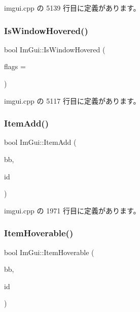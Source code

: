  imgui.\+cpp の 5139 行目に定義があります。

\mbox{\label{namespace_im_gui_aaed1ebf40cc2cb2ec30b0ba39b91d4a5}} 
\subsubsection{\texorpdfstring{Is\+Window\+Hovered()}{IsWindowHovered()}}
{\footnotesize\ttfamily bool Im\+Gui\+::\+Is\+Window\+Hovered (\begin{DoxyParamCaption}\item[{\mbox{\hyperlink{imgui_8h_a3a8f688665e5ea0bd9700e1251580a2c}{Im\+Gui\+Hovered\+Flags}}}]{flags = {} }\end{DoxyParamCaption})}



 imgui.\+cpp の 5117 行目に定義があります。

\mbox{\label{namespace_im_gui_a454e81b7c3befcc51c900f2fb3bd5a9a}} 
\subsubsection{\texorpdfstring{Item\+Add()}{ItemAdd()}}
{\footnotesize\ttfamily bool Im\+Gui\+::\+Item\+Add (\begin{DoxyParamCaption}\item[{const \mbox{\hyperlink{struct_im_rect}{Im\+Rect}} \&}]{bb,  }\item[{\mbox{\hyperlink{imgui_8h_a1785c9b6f4e16406764a85f32582236f}{Im\+Gui\+ID}}}]{id }\end{DoxyParamCaption})}



 imgui.\+cpp の 1971 行目に定義があります。

\mbox{\label{namespace_im_gui_a488b86a9f235923304186fb86ff64ffb}} 
\subsubsection{\texorpdfstring{Item\+Hoverable()}{ItemHoverable()}}
{\footnotesize\ttfamily bool Im\+Gui\+::\+Item\+Hoverable (\begin{DoxyParamCaption}\item[{const \mbox{\hyperlink{struct_im_rect}{Im\+Rect}} \&}]{bb,  }\item[{\mbox{\hyperlink{imgui_8h_a1785c9b6f4e16406764a85f32582236f}{Im\+Gui\+ID}}}]{id }\end{DoxyParamCaption})}



